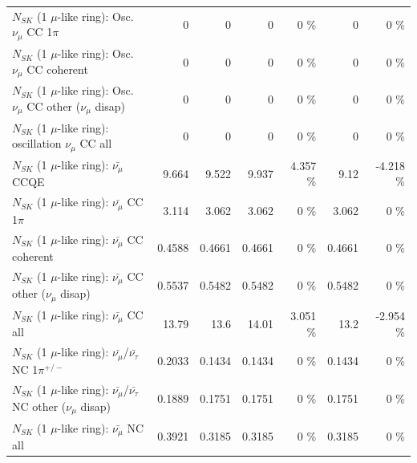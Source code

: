 \begin{table}
\begin{tabular}{| l | r | r | r  r | r  r |}
                          $N_{SK}$ (1 $\mu$-like ring): Osc. $\nu_\mu$ CC 1$\pi$ &               0 &               0 &               0 &        0 \%  &               0 &        0 \%  \\ 
                        $N_{SK}$ (1 $\mu$-like ring): Osc. $\nu_\mu$ CC coherent &               0 &               0 &               0 &        0 \%  &               0 &        0 \%  \\ 
         $N_{SK}$ (1 $\mu$-like ring): Osc. $\nu_\mu$ CC other ($\nu_\mu$ disap) &               0 &               0 &               0 &        0 \%  &               0 &        0 \%  \\ 
                      $N_{SK}$ (1 $\mu$-like ring): oscillation $\nu_\mu$ CC all &               0 &               0 &               0 &        0 \%  &               0 &        0 \%  \\ 
\hline
\hline
                              $N_{SK}$ (1 $\mu$-like ring): $\bar{\nu_\mu}$ CCQE &           9.664 &           9.522 &           9.937 &    4.357 \%  &            9.12 &   -4.218 \%  \\ 
                         $N_{SK}$ (1 $\mu$-like ring): $\bar{\nu_\mu}$ CC 1$\pi$ &           3.114 &           3.062 &           3.062 &        0 \%  &           3.062 &        0 \%  \\ 
                       $N_{SK}$ (1 $\mu$-like ring): $\bar{\nu_\mu}$ CC coherent &          0.4588 &          0.4661 &          0.4661 &        0 \%  &          0.4661 &        0 \%  \\ 
        $N_{SK}$ (1 $\mu$-like ring): $\bar{\nu_\mu}$ CC other ($\nu_\mu$ disap) &          0.5537 &          0.5482 &          0.5482 &        0 \%  &          0.5482 &        0 \%  \\ 
                          $N_{SK}$ (1 $\mu$-like ring): $\bar{\nu_{\mu}}$ CC all &           13.79 &            13.6 &           14.01 &    3.051 \%  &            13.2 &   -2.954 \%  \\ 
\hline
  $N_{SK}$ (1 $\mu$-like ring): $\bar{\nu_\mu}$/$\bar{\nu_\tau}$ NC 1$\pi^{+/-}$ &          0.2033 &          0.1434 &          0.1434 &        0 \%  &          0.1434 &        0 \%  \\ 
$N_{SK}$ (1 $\mu$-like ring): $\bar{\nu_\mu}$/$\bar{\nu_\tau}$ NC other ($\nu_\mu$ disap) &          0.1889 &          0.1751 &          0.1751 &        0 \%  &          0.1751 &        0 \%  \\ 
                          $N_{SK}$ (1 $\mu$-like ring): $\bar{\nu_{\mu}}$ NC all &          0.3921 &          0.3185 &          0.3185 &        0 \%  &          0.3185 &        0 \%  \\ 

\end{tabular}
\end{table}

